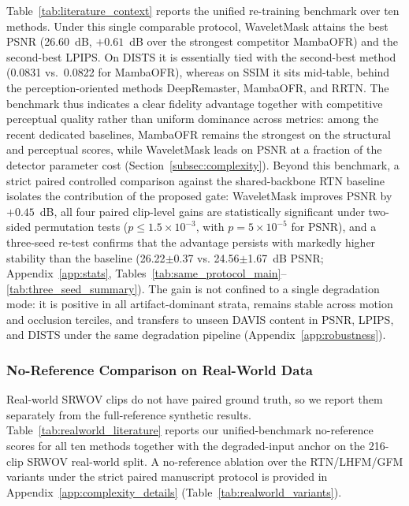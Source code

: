 {Table~\ref{tab:literature_context} reports the unified re-training benchmark over ten methods. Under this single comparable protocol, WaveletMask attains the best PSNR (26.60~dB, $+0.61$~dB over the strongest competitor MambaOFR) and the second-best LPIPS. On DISTS it is essentially tied with the second-best method (0.0831 vs.\ 0.0822 for MambaOFR), whereas on SSIM it sits mid-table, behind the perception-oriented methods DeepRemaster, MambaOFR, and RRTN. The benchmark thus indicates a clear fidelity advantage together with competitive perceptual quality rather than uniform dominance across metrics: among the recent dedicated baselines, MambaOFR remains the strongest on the structural and perceptual scores, while WaveletMask leads on PSNR at a fraction of the detector parameter cost (Section~\ref{subsec:complexity}). Beyond this benchmark, a strict paired controlled comparison against the shared-backbone RTN baseline isolates the contribution of the proposed gate: WaveletMask improves PSNR by $+0.45$~dB, all four paired clip-level gains are statistically significant under two-sided permutation tests ($p\le1.5\times10^{-3}$, with $p=5\times10^{-5}$ for PSNR), and a three-seed re-test confirms that the advantage persists with markedly higher stability than the baseline (26.22$\pm$0.37 vs. 24.56$\pm$1.67~dB PSNR; Appendix~\ref{app:stats}, Tables~\ref{tab:same_protocol_main}--\ref{tab:three_seed_summary}). The gain is not confined to a single degradation mode: it is positive in all artifact-dominant strata, remains stable across motion and occlusion terciles, and transfers to unseen DAVIS content in PSNR, LPIPS, and DISTS under the same degradation pipeline (Appendix~\ref{app:robustness}).

\subsubsection{No-Reference Comparison on Real-World Data}\label{subsec:realworld}

Real-world SRWOV clips do not have paired ground truth, so we report them separately from the full-reference synthetic results. Table~\ref{tab:realworld_literature} reports our unified-benchmark no-reference scores for all ten methods together with the degraded-input anchor on the 216-clip SRWOV real-world split. A no-reference ablation over the RTN/LHFM/GFM variants under the strict paired manuscript protocol is provided in Appendix~\ref{app:complexity_details} (Table~\ref{tab:realworld_variants}).

}
